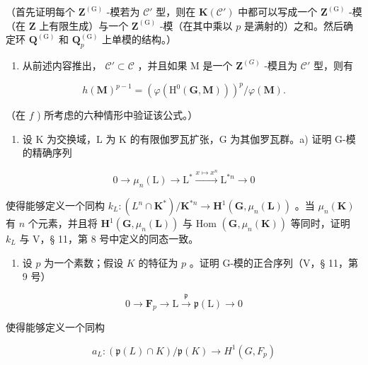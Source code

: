 （首先证明每个 \(\mathbf{Z}^{(\mathrm{G})}\) -模若为 \(\mathcal{C}'\) 型，则在 \(\mathbf{K}(\mathcal{C}')\) 中都可以写成一个 \(\mathbf{Z}^{(\mathrm{G})}\) -模（在 \(\mathbf{Z}\) 上有限生成）与一个 \(\mathbf{Z}^{(\mathrm{G})}\) -模（在其中乘以 \(p\) 是满射的）之和。然后确定环 \(\mathbf{Q}^{(\mathrm{G})}\) 和 \(\mathbf{Q}_p^{(\mathrm{G})}\) 上单模的结构。）

\begin{enumerate}
\def\labelenumi{\alph{enumi})}
\setcounter{enumi}{6}
\tightlist
\item
  从前述内容推出， \(\mathcal{C}' \subset \mathcal{C}\) ，并且如果 M 是一个 \(\mathbf{Z}^{(G)}\) -模且为 \(\mathcal{C}'\) 型，则有
\end{enumerate}

\[
h (\mathbf {M}) ^ {p - 1} = \left(\varphi \left(\mathrm{H} ^ {0} (\mathbf {G}, \mathbf {M})\right)\right) ^ {p} / \varphi (\mathbf {M}).
\]

（在 \(f\) ) 所考虑的六种情形中验证该公式。）

\begin{enumerate}
\def\labelenumi{\arabic{enumi})}
\setcounter{enumi}{21}
\tightlist
\item
  设 K 为交换域，L 为 K 的有限伽罗瓦扩张，G 为其伽罗瓦群。a) 证明 G-模的精确序列
\end{enumerate}

\[
0 \rightarrow \mu_ {n} (\mathrm{L}) \rightarrow \mathrm{L} ^ {*} \xrightarrow {x \mapsto x ^ {n}} \mathrm{L} ^ {* n} \rightarrow 0
\]

使得能够定义一个同构 \(k_{L}:(L^{n}\cap\mathbf{K}^{*})/\mathbf{K}^{*n}\to\mathbf{H}^{1}(\mathbf{G},\mu_{n}(\mathbf{L}))\) 。当 \(\mu_{n}(\mathbf{K})\) 有 \(n\) 个元素，并且将 \(\mathbf{H}^{1}(\mathbf{G},\mu_{n}(\mathbf{L}))\) 与 Hom \((\mathbf{G},\mu_{n}(\mathbf{K}))\) 等同时，证明 \(k_{L}\) 与 V，§ 11，第 8 号中定义的同态一致。

\begin{enumerate}
\def\labelenumi{\alph{enumi})}
\setcounter{enumi}{1}
\tightlist
\item
  设 \(p\) 为一个素数；假设 \(K\) 的特征为 \(p\) 。证明 G-模的正合序列（V，§ 11，第 9 号）
\end{enumerate}

\[
0 \to \mathbf {F} _ {p} \to \mathrm{L} \stackrel {{\mathfrak {p}}} {{\to}} \mathfrak {p} (\mathrm{L}) \to 0
\]

使得能够定义一个同构

\[
a _ {L}: (\mathfrak {p} (L) \cap K) / \mathfrak {p} (K) \rightarrow H ^ {1} (G, F _ {p})
\]

